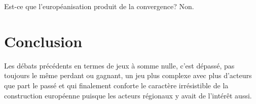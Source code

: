 Est-ce que l'européanisation produit de la convergence? Non.

\section{Conclusion}

Les débats précédents en termes de jeux à somme nulle, c'est dépassé, pas toujours le même perdant ou gagnant, un jeu plus complexe avec plus d'acteurs que part le passé et qui finalement conforte le caractère irrésistible de la construction européenne puisque les acteurs régionaux y avait de l'intérêt aussi.
